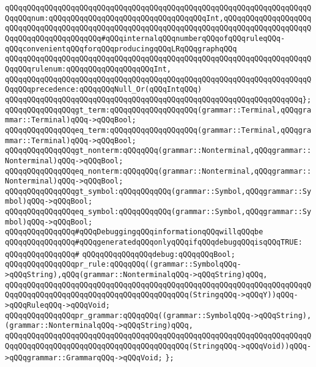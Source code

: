 \verb|qQQqqQQqqQQqqQQqqQQqqQQqqQQqqQQqqQQqqQQqqQQqqQQqqQQqqQQqqQQqqQQqqQQqqQQqqQQqnum:qQQqqQQqqQQqqQQqqQQqqQQqqQQqqQQqqQQqInt,qQQqqQQqqQQqqQQqqQQqqQQqqQQqqQQqqQQqqQQqqQQqqQQqqQQqqQQqqQQqqQQqqQQqqQQqqQQqqQQqqQQqqQQqqQQqqQQqqQQqqQQqqQQqqQQq#qQQqinternalqQQqnumberqQQqofqQQqruleqQQq-qQQqconvenientqQQqforqQQqproducingqQQqLRqQQqgraphqQQq|\newline
\verb|qQQqqQQqqQQqqQQqqQQqqQQqqQQqqQQqqQQqqQQqqQQqqQQqqQQqqQQqqQQqqQQqqQQqqQQqqQQqrulenum:qQQqqQQqqQQqqQQqqQQqInt,|\newline
\verb|qQQqqQQqqQQqqQQqqQQqqQQqqQQqqQQqqQQqqQQqqQQqqQQqqQQqqQQqqQQqqQQqqQQqqQQqqQQqprecedence:qQQqqQQqNull_Or(qQQqIntqQQq)|\newline
\verb|qQQqqQQqqQQqqQQqqQQqqQQqqQQqqQQqqQQqqQQqqQQqqQQqqQQqqQQqqQQqqQQqqQQq};|\newline
\newline
\verb|qQQqqQQqqQQqqQQqgt_term:qQQqqQQqqQQqqQQqqQQq(grammar::Terminal,qQQqgrammar::Terminal)qQQq->qQQqBool;|\newline
\verb|qQQqqQQqqQQqqQQqeq_term:qQQqqQQqqQQqqQQqqQQq(grammar::Terminal,qQQqgrammar::Terminal)qQQq->qQQqBool;|\newline
\newline
\verb|qQQqqQQqqQQqqQQqgt_nonterm:qQQqqQQq(grammar::Nonterminal,qQQqgrammar::Nonterminal)qQQq->qQQqBool;|\newline
\verb|qQQqqQQqqQQqqQQqeq_nonterm:qQQqqQQq(grammar::Nonterminal,qQQqgrammar::Nonterminal)qQQq->qQQqBool;|\newline
\newline
\verb|qQQqqQQqqQQqqQQqgt_symbol:qQQqqQQqqQQq(grammar::Symbol,qQQqgrammar::Symbol)qQQq->qQQqBool;|\newline
\verb|qQQqqQQqqQQqqQQqeq_symbol:qQQqqQQqqQQq(grammar::Symbol,qQQqgrammar::Symbol)qQQq->qQQqBool;|\newline
\newline
\verb|qQQqqQQqqQQqqQQq#qQQqDebuggingqQQqinformationqQQqwillqQQqbe|\newline
\verb|qQQqqQQqqQQqqQQq#qQQqgeneratedqQQqonlyqQQqifqQQqdebugqQQqisqQQqTRUE:|\newline
\verb|qQQqqQQqqQQqqQQq#|\newline
\verb|qQQqqQQqqQQqqQQqdebug:qQQqqQQqBool;|\newline
\newline
\verb|qQQqqQQqqQQqqQQqpr_rule:qQQqqQQq((grammar::SymbolqQQq->qQQqString),qQQq(grammar::NonterminalqQQq->qQQqString)qQQq,|\newline
\verb|qQQqqQQqqQQqqQQqqQQqqQQqqQQqqQQqqQQqqQQqqQQqqQQqqQQqqQQqqQQqqQQqqQQqqQQqqQQqqQQqqQQqqQQqqQQqqQQqqQQqqQQqqQQqqQQq(StringqQQq->qQQqY))qQQq->qQQqRuleqQQq->qQQqVoid;|\newline
\verb|qQQqqQQqqQQqqQQqpr_grammar:qQQqqQQq((grammar::SymbolqQQq->qQQqString),(grammar::NonterminalqQQq->qQQqString)qQQq,|\newline
\verb|qQQqqQQqqQQqqQQqqQQqqQQqqQQqqQQqqQQqqQQqqQQqqQQqqQQqqQQqqQQqqQQqqQQqqQQqqQQqqQQqqQQqqQQqqQQqqQQqqQQqqQQqqQQqqQQq(StringqQQq->qQQqVoid))qQQq->qQQqgrammar::GrammarqQQq->qQQqVoid;|\newline
\verb|};|\newline
\newline

